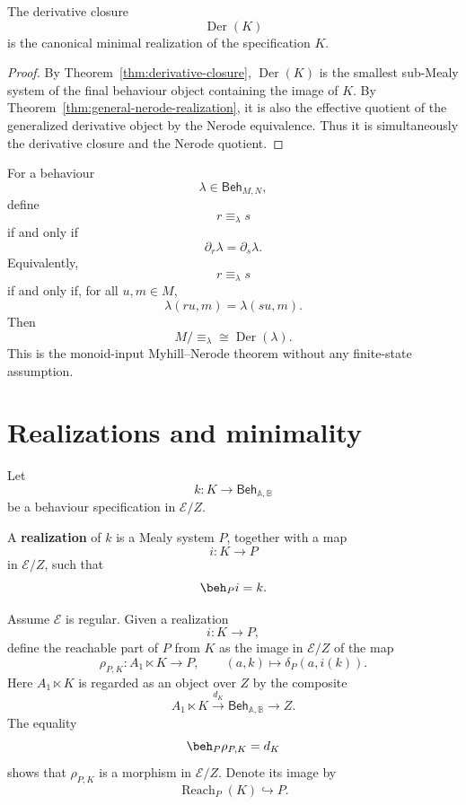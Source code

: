 \begin{corollary}
\label{cor:nerode-minimal-realization}
The derivative closure
\[
\operatorname{Der}(K)
\]
is the canonical minimal realization of the specification \(K\).
\end{corollary}

\begin{proof}
By Theorem~\ref{thm:derivative-closure}, \(\operatorname{Der}(K)\) is the
smallest sub-Mealy system of the final behaviour object containing the image
of \(K\). By Theorem~\ref{thm:general-nerode-realization}, it is also the
effective quotient of the generalized derivative object by the Nerode
equivalence. Thus it is simultaneously the derivative closure and the Nerode
quotient.
\end{proof}

\begin{example}
\label{ex:monoid-nerode-quotient}
For a behaviour
\[
\lambda\in\mathsf{Beh}_{M,N},
\]
define
\[
r\equiv_\lambda s
\]
if and only if
\[
\partial_r\lambda=\partial_s\lambda.
\]
Equivalently,
\[
r\equiv_\lambda s
\]
if and only if, for all \(u,m\in M\),
\[
\lambda(ru,m)=\lambda(su,m).
\]
Then
\[
M/{\equiv_\lambda}
\cong
\operatorname{Der}(\lambda).
\]
This is the monoid-input Myhill--Nerode theorem without any finite-state
assumption.
\end{example}

\section{Realizations and minimality}
\label{sec:realizations-and-minimality}

Let
\[
k:K\to\mathsf{Beh}_{\mathbb A,\mathbb B}
\]
be a behaviour specification in \(\mathcal E/Z\).

\begin{definition}[Realization]
\label{def:behaviour-realization}
A \textbf{realization} of \(k\) is a Mealy system \(P\), together with a map
\[
i:K\to P
\]
in \(\mathcal E/Z\), such that
\[
\beh_P i=k.
\]
\end{definition}

Assume \(\mathcal E\) is regular. Given a realization
\[
i:K\to P,
\]
define the reachable part of \(P\) from \(K\) as the image in
\(\mathcal E/Z\) of the map
\[
\rho_{P,K}:
A_1\ltimes K
\to
P,
\qquad
(a,k)\mapsto \delta_P(a,i(k)).
\]
Here \(A_1\ltimes K\) is regarded as an object over \(Z\) by the composite
\[
A_1\ltimes K
\xrightarrow{d_K}
\mathsf{Beh}_{\mathbb A,\mathbb B}
\to Z.
\]
The equality
\[
\beh_P\rho_{P,K}=d_K
\]
shows that \(\rho_{P,K}\) is a morphism in \(\mathcal E/Z\). Denote its image
by
\[
\operatorname{Reach}_P(K)\hookrightarrow P.
\]

